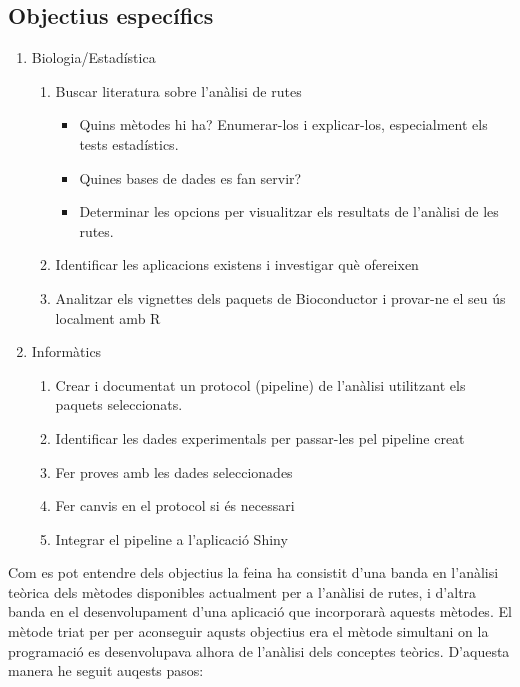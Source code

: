 \documentclass[]{article}
\begin{document}
\subsection{Objectius específics}
\begin{enumerate}
\item Biologia/Estadística
\begin{enumerate}
\item Buscar literatura sobre l'anàlisi de rutes
\begin{itemize}
\item Quins mètodes hi ha? Enumerar-los i explicar-los, especialment els tests estadístics.
\item Quines bases de dades es fan servir?
\item Determinar les opcions per visualitzar els resultats de l'anàlisi de les rutes.
\end{itemize}
\item Identificar les aplicacions existens i investigar què ofereixen
\item Analitzar els vignettes dels paquets de Bioconductor i provar-ne el seu ús localment amb R
\end{enumerate}
\item Informàtics
\begin{enumerate}
\item Crear i documentat un protocol (pipeline) de l'anàlisi utilitzant els paquets seleccionats. 
\item Identificar les dades experimentals per passar-les pel pipeline creat
\item Fer proves amb les dades seleccionades
\item Fer canvis en el protocol si és necessari
\item Integrar el pipeline a l'aplicació Shiny
\end{enumerate}
\end{enumerate}

Com es pot entendre dels objectius la feina ha consistit d'una banda en l'anàlisi teòrica dels mètodes disponibles actualment per a l'anàlisi de rutes, i d'altra banda en el desenvolupament d'una aplicació que incorporarà aquests mètodes. El mètode triat per per aconseguir aqusts objectius era el mètode simultani on la programació es desenvolupava alhora de l'anàlisi dels conceptes teòrics. D'aquesta manera he seguit auqests pasos:
\end{document}
